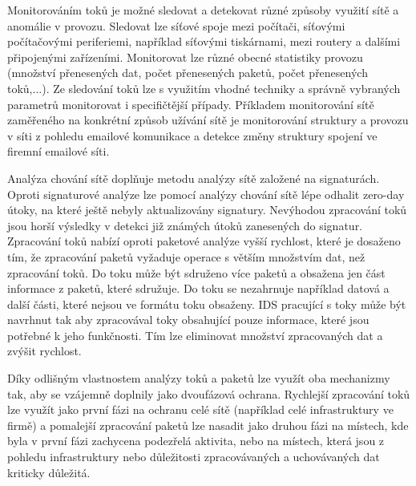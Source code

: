 \documentclass[thesis=M,czech]{FITthesis}[2012/06/26]
\begin{document}
Monitorováním toků je možné sledovat a detekovat různé způsoby využití sítě a anomálie v provozu. Sledovat lze síťové spoje mezi počítači, síťovými počítačovými periferiemi, například síťovými tiskárnami, mezi routery a dalšími připojenými zařízeními. Monitorovat lze různé obecné statistiky provozu (množství přenesených dat, počet přenesených paketů, počet přenesených toků,...). Ze sledování toků lze s využitím vhodné techniky a správně vybraných parametrů monitorovat i specifičtější případy. Příkladem monitorování sítě zaměřeného na konkrétní způsob užívání sítě je monitorování struktury a provozu v síti z pohledu emailové komunikace a detekce změny struktury spojení ve firemní emailové síti.\par
Analýza chování sítě doplňuje metodu analýzy sítě založené na signaturách. Oproti signaturové analýze lze pomocí analýzy chování sítě lépe odhalit zero-day útoky, na které ještě nebyly aktualizovány signatury. Nevýhodou zpracování toků jsou horší výsledky v detekci již známých útoků zanesených do signatur. Zpracování toků nabízí oproti paketové analýze vyšší rychlost, které je dosaženo tím, že zpracování paketů vyžaduje operace s větším množstvím dat, než zpracování toků. Do toku může být sdruženo více paketů a obsažena jen část informace z paketů, které sdružuje. Do toku se nezahrnuje například datová a další části, které nejsou ve formátu toku obsaženy. IDS pracující s toky může být navrhnut tak aby zpracovával toky obsahující pouze informace, které jsou potřebné k jeho funkčnosti. Tím lze eliminovat množství zpracovaných dat a zvýšit rychlost.\par Díky odlišným vlastnostem analýzy toků a paketů lze využít oba mechanizmy tak, aby se vzájemně doplnily jako dvoufázová ochrana. Rychlejší zpracování toků lze využít jako první fázi na ochranu celé sítě (například celé infrastruktury ve firmě) a pomalejší zpracování paketů lze nasadit jako druhou fázi na místech, kde byla v první fázi zachycena podezřelá aktivita, nebo na místech, která jsou z pohledu infrastruktury nebo důležitosti zpracovávaných a uchovávaných dat kriticky důležitá.\par
\end{document}
